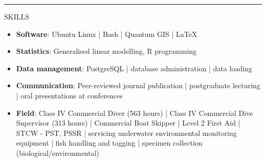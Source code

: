 \documentclass[10pt,a4paper]{article}
\begin{document}
\hrule
\vspace{6pt}
\noindent
SKILLS
	\begin{itemize}
		\setlength\itemsep{0.05em}
		\item \textbf{Software}: Ubuntu Linux | Bash | Quantum GIS | \LaTeX\
		\item \textbf{Statistics}: Generalised linear modelling, R programming
		\item \textbf{Data management}: PostgreSQL | database administration | data loading 
		\item \textbf{Communication}: Peer-reviewed journal publication | postgraduate lecturing | oral	presentations at conferences
		\item \textbf{Field}: Class IV Commercial Diver (563 hours) | Class IV Commercial Dive Supervisor 
		(313 hours) | Commercial Boat Skipper | Level 2 First Aid | STCW - PST, PSSR | servicing underwater environmental 
		monitoring equipment | fish handling and tagging | specimen collection (biological/environmental)
	\end{itemize}	
\end{document}
